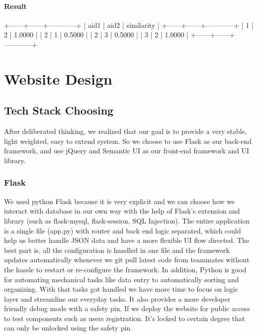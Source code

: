 \documentclass[letterpaper, 12pt]{report}
\begin{document}
	\subsubsection{Result}
	\begin{spverbatim}
		+------+------+------------+
		| aid1 | aid2 | similarity |
		+------+------+------------+
		|    1 |    2 | 1.0000     |
		|    2 |    1 | 0.5000     |
		|    2 |    3 | 0.5000     |
		|    3 |    2 | 1.0000     |
		+------+------+------------+
	\end{spverbatim}
	
	\chapter{Website Design}
	\section{Tech Stack Choosing}
	After deliberated thinking, we realized that our goal is to provide a very stable, light weighted, easy to extend system. So we choose to use Flask as our back-end framework, and use jQuery and Semantic UI as our front-end framework and UI library. 
	\subsection{Flask}
	We used python Flask because it is very explicit and we can choose how we interact with database in our own way with the help of Flask’s extension and library (such as flask-mysql, flask-session, SQL Injection). The entire application is a single file (app.py) with router and back end logic separated, which could help us better handle JSON data and have a more flexible UI flow directed. The best part is, all the configuration is handled in one file and the framework updates automatically whenever we git pull latest code from teammates without the hassle to restart or re-configure the framework.
	In addition, Python is good for automating mechanical tasks like data entry to automatically sorting and organizing. With that tasks got handled we have more time to focus on logic layer and streamline our everyday tasks.
	It also provides a more developer friendly debug mode with a safety pin. If we deploy the website for public access to test components such as users registration. It’s locked to certain degree that can only be unlocked using the safety pin. 
	
\end{document}
